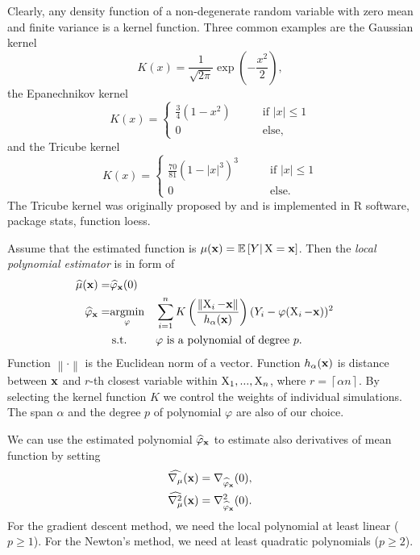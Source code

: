 Clearly, any density function of a non-degenerate random variable with zero mean and finite variance is a kernel function. Three common examples are the Gaussian kernel
\[
	K(x) = \frac{1}{\sqrt{2 \pi}} \exp \left( - \frac{x^2}{2} \right),
\]
the Epanechnikov kernel
\[
	K(x) = \begin{cases}
		\frac{3}{4} (1-x^2) \qquad & \text{if } \vert x \vert \leq 1 \\
		0 \qquad & \text{else,}
	\end{cases}
\]
and the Tricube kernel
\[
	K(x) = \begin{cases}
		\frac{70}{81} (1 - \left| x \right|^3)^3 \qquad & \text{if } \vert x \vert \leq 1 \\
		0 \qquad & \text{else.}
	\end{cases}
\]
The Tricube kernel was originally proposed by \cite{Cleveland79} and is implemented in R software, package stats, function loess.

Assume that the estimated function is $\mu (\mathbf{x}) = \operatorname{\mathbb{E}\,} [ Y \vert \operatorname{\bm{X}} = \mathbf{x} ]$. Then the \emph{local polynomial estimator} is in form of
\begin{equation}
	\label{eq:locReg}
	\begin{aligned}
		\widehat{\mu} (\mathbf{x}) = & \widehat{\varphi}_{\mathbf{x}} (\operatorname{\bm{0}}) \\
		\widehat{\varphi}_{\mathbf{x}} = & \underset{\varphi}{\operatorname{\textrm{argmin}}} & & \sum_{i=1}^n K \left( \frac{ \left\| \operatorname{\bm{X}}_i - \mathbf{x} \right\| }{h_{\alpha}(\mathbf{x})} \right) (Y_i - \varphi (\operatorname{\bm{X}}_i-\mathbf{x}))^2 \\
		& \operatorname{\textrm{s.t.}} & & \varphi \text{ is a polynomial of degree } p.
	\end{aligned}
\end{equation}
Function $\left\| \cdot \right\|$ is the Euclidean norm of a vector. Function $h_{\alpha} (\mathbf{x})$ is distance between $\mathbf{x}$ and $r$-th closest variable within $\operatorname{\bm{X}}_1, ..., \operatorname{\bm{X}}_n$, where $r = \left\lceil \alpha n \right\rceil$. By selecting the kernel function $K$ we control the weights of individual simulations. The span $\alpha$ and the degree $p$ of polynomial $\varphi$ are also of our choice.

We can use the estimated polynomial $\widehat{\varphi}_{\mathbf{x}}$ to estimate also derivatives of mean function by setting
\begin{align*}
	\widehat{\nabla_{\mu}} (\mathbf{x}) &= \nabla_{\widehat{\varphi}_{\mathbf{x}}} (\operatorname{\bm{0}}), \\
	\widehat{\nabla_{\mu}^2} (\mathbf{x}) &= \nabla_{\widehat{\varphi}_{\mathbf{x}}}^2 (\operatorname{\bm{0}}).
\end{align*}
For the gradient descent method, we need the local polynomial at least linear ($p \geq 1$). For the Newton's method, we need at least quadratic polynomials ($p \geq 2$).

